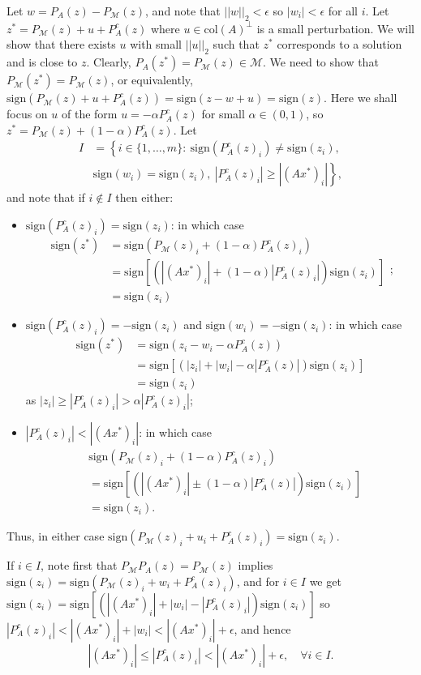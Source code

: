 \documentclass[journal]{IEEEtran}
\theoremstyle{definition}
\theoremstyle{remark}
\theoremstyle{definition}
\theoremstyle{problem}
\theoremstyle{definition}
\newcommand{\col}{\text{col}}
\newcommand{\sign}{\text{sign}}
\newcommand{\MM}{\mathcal{M}}
\begin{document}
Let $w = P_A(z) - P_{\MM}(z)$, and note that $||w||_2 < \epsilon$ so $|w_i|< \epsilon$ for all $i$. Let $z^* = P_{\MM}(z) + u + P_A^c(z)$ where $u\in\col(A)^{\perp}$ is a small perturbation. We will show that there exists $u$ with small $||u||_2$ such that $z^*$ corresponds to a solution and is close to $z$. Clearly, $P_A(z^*)=P_{\MM}(z)\in\MM$. We need to show that $P_{\MM}(z^*)=P_{\MM}(z)$, or equivalently, $\sign(P_{\MM}(z)+u+P_A^c(z))=\sign(z-w+u)=\sign(z)$. Here we shall focus on $u$ of the form $u=-\alpha P_A^c(z)$ for small $\alpha\in(0,1)$, so $z^* = P_{\MM}(z) + (1-\alpha)P_A^c(z)$. Let
\[\begin{aligned}I &= \left\{i\in\{1,\ldots, m\}:\ \sign(P_A^c(z)_i)\neq \sign(z_i),\right. \\ &\left.  \sign(w_i) = \sign(z_i),\ |P_A^c(z)_i|\geq |(Ax^*)_i|\right\},\end{aligned}\]
and note that if $i\notin I$ then either:
\begin{itemize}
	\item $\sign(P_A^c(z)_i)=\sign(z_i)$: in which case
	\[\begin{aligned} \sign(z^*)&=\sign(P_{\MM}(z)_i+(1-\alpha)P_A^c(z)_i)\\& =\sign\left[(|(Ax^*)_i|+(1-\alpha)|P_A^c(z)_i|)\sign(z_i)\right]\\&=\sign(z_i) \end{aligned};\]
	
	\item $\sign(P_A^c(z)_i)=-\sign(z_i)$ and $\sign(w_i) = -\sign(z_i)$: in which case
	\[ \begin{aligned}
      \sign(z^*)&=\sign(z_i-w_i-\alpha P_A^c(z))\\&=\sign\left[(|z_i|+|w_i|-\alpha|P_A^c(z)|)\sign(z_i)\right]\\&=\sign(z_i)
	\end{aligned}\]
	 as $|z_i|\geq |P_A^c(z)_i| > \alpha|P_A^c(z)_i|$;
	 
	\item $|P_A^c(z)_i|<|(Ax^*)_i|$: in which case
	\[\begin{aligned}
	&\sign(P_{\MM}(z)_i+(1-\alpha)P_A^c(z)_i) \\&= \sign[(|(Ax^*)_i|\pm (1-\alpha)|P_A^c(z)|)\sign(z_i)] \\&= \sign(z_i).
	\end{aligned}\]
\end{itemize}
Thus, in either case $\sign(P_{\MM}(z)_i + u_i + P_A^c(z)_i) = \sign(z_i)$.

If $i\in I$, note first that $P_{\MM}P_A(z) = P_{\MM}(z)$ implies $\sign(z_i) = \sign(P_{\MM}(z)_i+w_i+P_A^c(z)_i)$, and for $i\in I$ we get $\sign(z_i) = \sign\left[(|(Ax^*)_i| + |w_i| - |P_A^c(z)_i|)\sign(z_i)\right]$ so $|P_A^c(z)_i|<|(Ax^*)_i| + |w_i|< |(Ax^*)_i| + \epsilon$, and hence
\[|(Ax^*)_i|\leq |P_A^c(z)_i|<|(Ax^*)_i| + \epsilon,\quad \forall i\in I.\]
\end{document}
